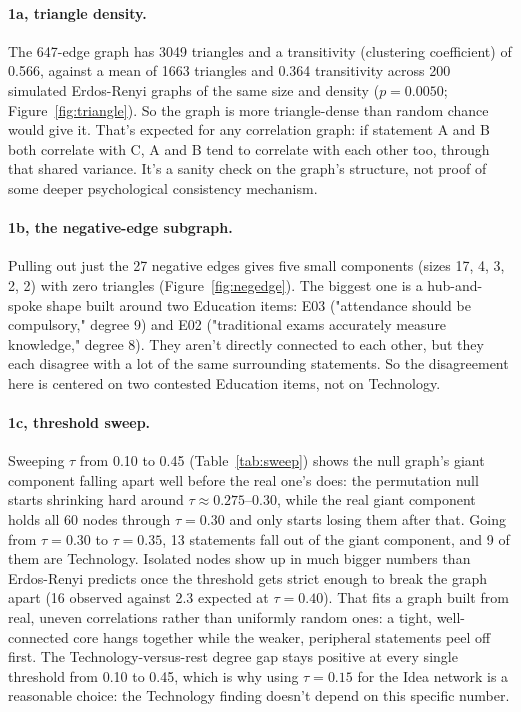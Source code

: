 \documentclass[11pt]{article}
\begin{document}
\paragraph{1a, triangle density.} The 647-edge graph has 3049 triangles and a transitivity (clustering
coefficient) of 0.566, against a mean of 1663 triangles and 0.364 transitivity across 200 simulated
Erdos-Renyi graphs of the same size and density ($p = 0.0050$; Figure~\ref{fig:triangle}). So the graph
is more triangle-dense than random chance would give it. That's expected for any correlation graph: if
statement A and B both correlate with C, A and B tend to correlate with each other too, through that
shared variance. It's a sanity check on the graph's structure, not proof of some deeper psychological
consistency mechanism.

\paragraph{1b, the negative-edge subgraph.} Pulling out just the 27 negative edges gives five small
components (sizes 17, 4, 3, 2, 2) with zero triangles (Figure~\ref{fig:negedge}). The biggest one is a
hub-and-spoke shape built around two Education items: E03 ("attendance should be compulsory," degree
9) and E02 ("traditional exams accurately measure knowledge," degree 8). They aren't directly connected
to each other, but they each disagree with a lot of the same surrounding statements. So the
disagreement here is centered on two contested Education items, not on Technology.

\paragraph{1c, threshold sweep.} Sweeping $\tau$ from 0.10 to 0.45 (Table~\ref{tab:sweep}) shows the
null graph's giant component falling apart well before the real one's does: the permutation null
starts shrinking hard around $\tau \approx 0.275$--$0.30$, while the real giant component holds all 60
nodes through $\tau = 0.30$ and only starts losing them after that. Going from $\tau = 0.30$ to
$\tau = 0.35$, 13 statements fall out of the giant component, and 9 of them are Technology. Isolated
nodes show up in much bigger numbers than Erdos-Renyi predicts once the threshold gets strict enough to
break the graph apart (16 observed against 2.3 expected at $\tau = 0.40$). That fits a graph built from
real, uneven correlations rather than uniformly random ones: a tight, well-connected core hangs
together while the weaker, peripheral statements peel off first. The Technology-versus-rest degree gap
stays positive at every single threshold from 0.10 to 0.45, which is why using $\tau = 0.15$ for the
Idea network is a reasonable choice: the Technology finding doesn't depend on this specific number.
\end{document}
